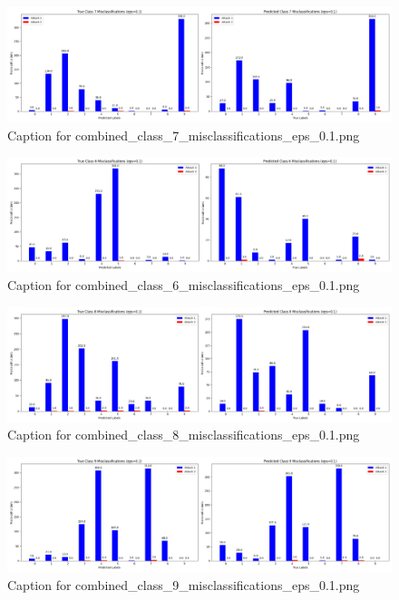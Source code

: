 \documentclass[11pt,onside]{article}
\begin{document}
\begin{figure}[ht]
\centering
\includegraphics[width=1\textwidth]{combined_class_boundary_pgd/combined_class_7_misclassifications_eps_0.1.png}
\caption{Caption for combined_class_7_misclassifications_eps_0.1.png}
\label{fig:combined_class_7_misclassifications_eps_0.1.png}
\end{figure}

\begin{figure}[ht]
\centering
\includegraphics[width=1\textwidth]{combined_class_boundary_pgd/combined_class_6_misclassifications_eps_0.1.png}
\caption{Caption for combined_class_6_misclassifications_eps_0.1.png}
\label{fig:combined_class_6_misclassifications_eps_0.1.png}
\end{figure}

\begin{figure}[ht]
\centering
\includegraphics[width=1\textwidth]{combined_class_boundary_pgd/combined_class_8_misclassifications_eps_0.1.png}
\caption{Caption for combined_class_8_misclassifications_eps_0.1.png}
\label{fig:combined_class_8_misclassifications_eps_0.1.png}
\end{figure}

\begin{figure}[ht]
\centering
\includegraphics[width=1\textwidth]{combined_class_boundary_pgd/combined_class_9_misclassifications_eps_0.1.png}
\caption{Caption for combined_class_9_misclassifications_eps_0.1.png}
\label{fig:combined_class_9_misclassifications_eps_0.1.png}
\end{figure}
\end{document}
